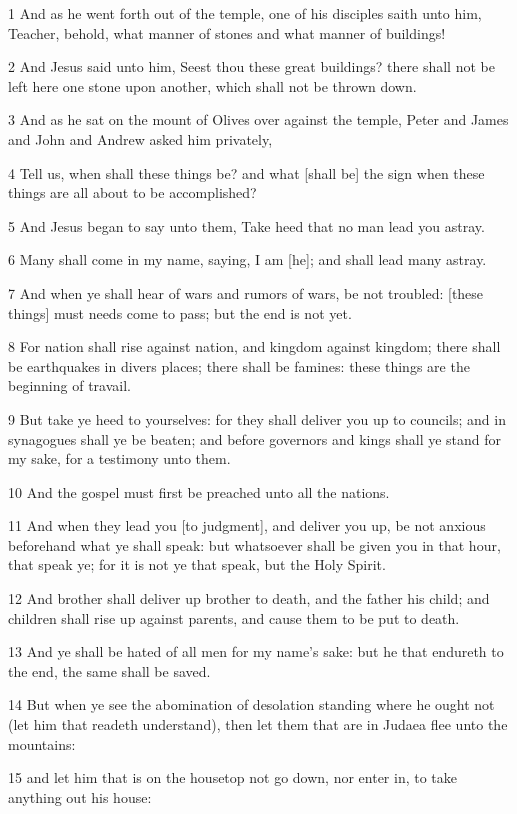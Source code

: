 \par 1 And as he went forth out of the temple, one of his disciples saith unto him, Teacher, behold, what manner of stones and what manner of buildings!
\par 2 And Jesus said unto him, Seest thou these great buildings? there shall not be left here one stone upon another, which shall not be thrown down.
\par 3 And as he sat on the mount of Olives over against the temple, Peter and James and John and Andrew asked him privately,
\par 4 Tell us, when shall these things be? and what [shall be] the sign when these things are all about to be accomplished?
\par 5 And Jesus began to say unto them, Take heed that no man lead you astray.
\par 6 Many shall come in my name, saying, I am [he]; and shall lead many astray.
\par 7 And when ye shall hear of wars and rumors of wars, be not troubled: [these things] must needs come to pass; but the end is not yet.
\par 8 For nation shall rise against nation, and kingdom against kingdom; there shall be earthquakes in divers places; there shall be famines: these things are the beginning of travail.
\par 9 But take ye heed to yourselves: for they shall deliver you up to councils; and in synagogues shall ye be beaten; and before governors and kings shall ye stand for my sake, for a testimony unto them.
\par 10 And the gospel must first be preached unto all the nations.
\par 11 And when they lead you [to judgment], and deliver you up, be not anxious beforehand what ye shall speak: but whatsoever shall be given you in that hour, that speak ye; for it is not ye that speak, but the Holy Spirit.
\par 12 And brother shall deliver up brother to death, and the father his child; and children shall rise up against parents, and cause them to be put to death.
\par 13 And ye shall be hated of all men for my name's sake: but he that endureth to the end, the same shall be saved.
\par 14 But when ye see the abomination of desolation standing where he ought not (let him that readeth understand), then let them that are in Judaea flee unto the mountains:
\par 15 and let him that is on the housetop not go down, nor enter in, to take anything out his house:
